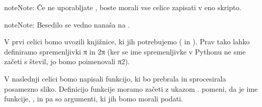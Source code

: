 \documentclass[letterpaper,10pt,english]{sphinxmanual}
\begin{document}
\begin{sphinxadmonition}{note}{Note:}
\sphinxAtStartPar
Če ne uporabljate , boste morali vse celice zapisati v eno skripto.
\end{sphinxadmonition}

\begin{sphinxadmonition}{note}{Note:}
\sphinxAtStartPar
Besedilo se vedno nanaša na .
\end{sphinxadmonition}

\sphinxAtStartPar
V prvi celici bomo uvozili knjižnice, ki jih potrebujemo ( in ). Prav tako lahko definiramo spremenljivki π in 2π (ker se ime spremenljivke v Pythonu ne sme začeti s števil, jo bomo poimenovali π2).

\begin{sphinxVerbatim}[commandchars=\\\{\},numbers=left,firstnumber=1,stepnumber=1]
 
   

 
 
\end{sphinxVerbatim}

\sphinxAtStartPar
V naslednji celici bomo napisali funkcijo, ki bo prebrala in sprocesirala posamezno sliko. Definicijo funkcije moramo začeti z ukazom .  pomeni, da je  ime funkcije, ,  in  pa so argumenti, ki jih bomo morali podati.
\end{document}

